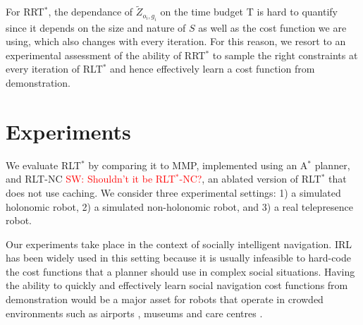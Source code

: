 \documentclass[letterpaper, 10 pt, conference]{ieeeconf}
\newcommand{\sw}[1]{\textcolor{red}{SW: #1}}
\begin{document}



For RRT$^*$, the dependance of $\tilde{Z}_{o_i,g_i}$ on the time budget T is hard to quantify since it depends on the size and nature of $S$ as well as the cost function we are using, which also changes with every iteration. For this reason, we resort to an experimental assessment of the ability of RRT$^*$ to sample the right constraints at every iteration of RLT$^*$ and hence effectively learn a cost function from demonstration.

\section{Experiments}

We evaluate RLT$^*$ by comparing it to MMP, implemented using an A$^*$ planner, and RLT-NC \sw{Shouldn't it be RLT$^*$-NC?}, an ablated version of RLT$^*$ that does not use caching.  We consider three experimental settings: 1) a simulated holonomic robot, 2) a simulated non-holonomic robot, and 3) a real telepresence robot.
	
	Our experiments take place in the context of socially intelligent navigation. IRL has been widely used in this setting \cite{okallearning,henry2010learning,vasquez2014inverse} because it is usually infeasible to hard-code the cost functions that a planner should use in complex social situations. Having the ability to quickly and effectively learn social navigation cost functions from demonstration would be a major asset for robots that operate in crowded environments such as airports \cite{triebel2015spencer}, museums \cite{thrun1999minerva} and care centres \cite{shiarlis2015teresa}.
	
\end{document}
